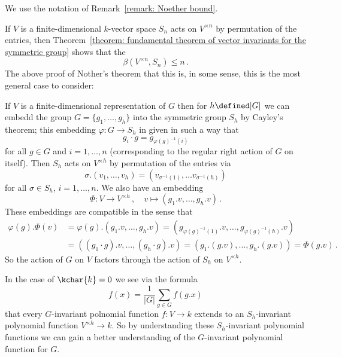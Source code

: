 \begin{fluff}
  We use the notation of Remark~\ref{remark: Noether bound}.
  
  If $V$ is a finite-dimensional $k$-vector space $S_n$ acts on $V^{\times n}$ by permutation of the entries, then Theorem~\ref{theorem: fundamental theorem of vector invariants for the symmetric group} shows that the
  \[
          \beta(V^{\times n}, S_n)
    \leq  n \,.
  \]
  The above proof of Nother’s theorem that this is, in some sense, this is the most general case to consider:
  
  If $V$ is a finite-dimensional representation of $G$ then for $h \defined |G|$ we can embedd the group $G = \{g_1, \dotsc, g_h\}$ into the symmetric group $S_h$ by Cayley’s theorem;
  this embedding $\varphi \colon G \to S_h$ in given in such a way that
  \[
    g_i \cdot g
    = g_{\varphi(g)^{-1}(i)}
  \]
  for all $g \in G$ and $i = 1, \dotsc, n$ (corresponding to the regular right action of $G$ on itself).
  Then $S_h$ acts on $V^{\times h}$ by permutation of the entries via
  \[
      \sigma.(v_1, \dotsc, v_h)
    = (v_{\sigma^{-1}(1)}, \dotsc v_{\sigma^{-1}(h)})
  \]
  for all $\sigma \in S_h$, $i = 1, \dotsc, n$.
  We also have an embedding
  \[
            \Phi
    \colon  V
    \to     V^{\times h} \,,
    \quad   v
    \mapsto \left( g_1.v, \dotsc, g_h.v \right) \,.
  \]
  These embeddings are compatible in the sense that
  \begin{align*}
        \varphi(g).\Phi(v)
    &=  \varphi(g).(g_1.v, \dotsc, g_h.v)
     =  \left( g_{\varphi(g)^{-1}(1)}.v, \dotsc, g_{\varphi(g)^{-1}(h)}.v \right) \\
    &=  ( (g_1 \cdot g).v, \dotsc, (g_h \cdot g).v )
     =  ( g_1.(g.v), \dotsc, g_h.(g.v) )
     =  \Phi(g.v) \,.
  \end{align*}
  So the action of $G$ on $V$ factors through the action of $S_h$ on $V^{\times h}$.
  
  In the case of $\kchar{k} = 0$ we see via the formula
  \[
      f(x)
    = \frac{1}{|G|} \sum_{g \in G} f(g.x)
  \]
  that every $G$-invariant polnomial function $f \colon V \to k$ extends to an $S_h$-invariant polynomial function $V^{\times h} \to k$.
  So by understanding these $S_h$-invariant polynomial functions we can gain a better understanding of the $G$-invariant polynomial function for $G$.
\end{fluff}




